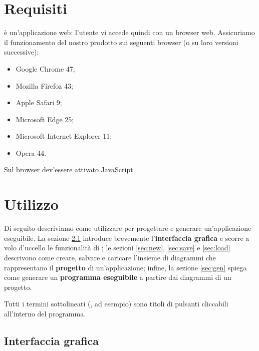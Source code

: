 
\section{Requisiti} \label{sec:requisiti}

\proj{} è un'applicazione web: l'utente vi accede quindi con un browser web. Assicuriamo il funzionamento del nostro prodotto sui seguenti browser (o su loro versioni successive):
\begin{itemize}
	\item Google Chrome 47;
	\item Mozilla Firefoz 43;
	\item Apple Safari 9;
	\item Microsoft Edge 25;
	\item Microsoft Internet Explorer 11;
	\item Opera 44.
\end{itemize}
Sul browser dev'essere attivato JavaScript.






\section{Utilizzo} \label{sec:utilizzo}

Di seguito descriviamo come utilizzare \proj{} per progettare e generare un'applicazione eseguibile. La sezione \ref{sec:gui} introduce brevemente l'\textbf{interfaccia grafica} e scorre a volo d'uccello le funzionalità di \proj; le sezioni \ref{sec:new}, \ref{sec:save} e \ref{sec:load} descrivono come creare, salvare e caricare l'insieme di diagrammi che rappresentano il \textbf{progetto} di un'applicazione; infine, la sezione \ref{sec:gen} spiega come generare un \textbf{programma eseguibile} a partire dai diagrammi di un progetto.

Tutti i termini sottolineati (, ad esempio) sono titoli di pulsanti cliccabili all'interno del programma.



\subsection{Interfaccia grafica} \label{sec:gui}


